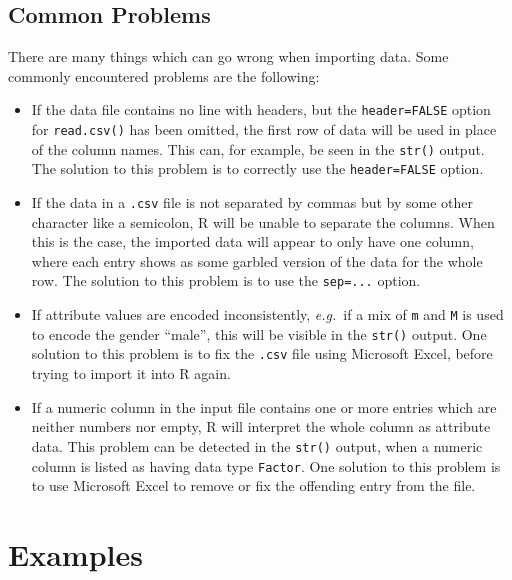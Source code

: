 \documentclass[
  a4paper,
]{article}
\theoremstyle{definition}
\theoremstyle{definition}
\theoremstyle{definition}
\theoremstyle{definition}
\theoremstyle{remark}
\begin{document}
\hypertarget{common-problems}{%
\subsection*{Common Problems}\label{common-problems}}

There are many things which can go wrong when importing data. Some commonly
encountered problems are the following:

\begin{itemize}
\item
  If the data file contains no line with headers, but the
  \texttt{header=FALSE} option for \texttt{read.csv()} has been omitted,
  the first row of data will be used in place of the column names.
  This can, for example, be seen in the \texttt{str()} output. The
  solution to this problem is to correctly use the
  \texttt{header=FALSE} option.
\item
  If the data in a \texttt{.csv} file is not separated by commas but
  by some other character like a semicolon, R will be unable to
  separate the columns. When this is the case, the imported data will
  appear to only have one column, where each entry shows as some
  garbled version of the data for the whole row. The solution to this
  problem is to use the \texttt{sep=...} option.
\item
  If attribute values are encoded inconsistently, \emph{e.g.}~if
  a mix of \texttt{m} and \texttt{M} is used to encode the gender
  ``male'', this will be visible in the \texttt{str()} output. One
  solution to this problem is to fix the \texttt{.csv} file using
  Microsoft Excel, before trying to import it into R again.
\item
  If a numeric column in the input file contains one or more
  entries which are neither numbers nor empty, R will interpret the
  whole column as attribute data. This problem can be detected in the
  \texttt{str()} output, when a numeric column is listed as having data
  type \texttt{Factor}. One solution to this problem is to use
  Microsoft Excel to remove or fix the offending entry from the file.
\end{itemize}

\clearpage

\hypertarget{S07-examples}{%
\section{Examples}\label{S07-examples}}
\end{document}
